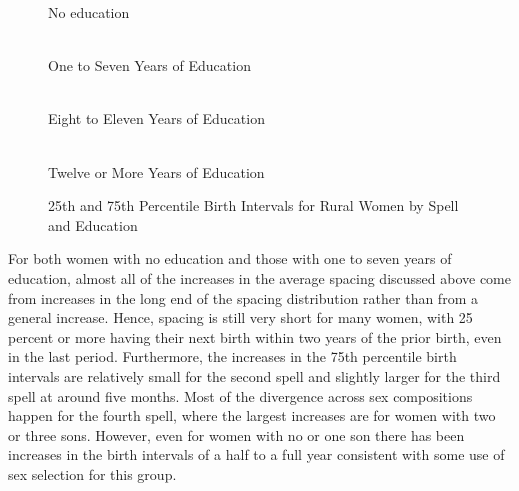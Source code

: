 \documentclass[12pt,letterpaper]{article}
\begin{document}
\begin{figure}[htpb]
\captionsetup[subfigure]{position=top}
\captionsetup{font=footnotesize,skip=2pt}
\centering
\caption*{No education}
\\
\caption*{One to Seven Years of Education}
\\
\caption*{Eight to Eleven Years of Education}
\\
\caption*{Twelve or More Years of Education}
\begin{minipage}{0.32\textwidth}\hspace{1cm}\end{minipage}
\captionsetup{font=normalsize}
\caption{
25th and 75th Percentile Birth Intervals for Rural Women by Spell and Education
}
\label{fig:combined_p25_p75_rural}
\end{figure}


For both women with no education and those with one to seven years of education,
almost all of the increases in the average spacing discussed above come from increases in 
the long end of the spacing distribution rather than from a general increase.
Hence, spacing is still very short for many women, with 25 percent or more having
their next birth within two years of the prior birth, even in the last period.
Furthermore, the increases in the 75th percentile birth intervals are relatively small
for the second spell and slightly larger for the third spell at around five months.
Most of the divergence across sex compositions happen for the fourth spell, where 
the largest increases are for women with two or three sons.
However, even for women with no or one son there has been increases in the birth intervals 
of a half to a full year consistent with some use of sex selection for this group.
\end{document}
